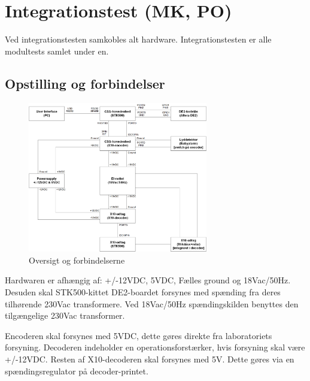 \section{Integrationstest (MK, PO)}
Ved integrationstesten samkobles alt hardware. Integrationstesten er alle modultests samlet under en. 

\subsection{Opstilling og forbindelser}

\begin{figure}[H]
	\centering
	\includegraphics[width=0.7\textwidth]{billeder/IntTest/Integration_oversigt}
	\caption{Oversigt og forbindelserne}
	\label{fig:integration_oversigt}
\end{figure}

Hardwaren er afhængig af: +/-12VDC, 5VDC, Fælles ground og 18Vac/50Hz. Desuden skal STK500-kittet DE2-boardet forsynes med spænding fra deres tilhørende 230Vac transformere. Ved 18Vac/50Hz spændingskilden benyttes den tilgængelige 230Vac transformer. 

Encoderen skal forsynes med 5VDC, dette gøres direkte fra laboratoriets forsyning.
Decoderen indeholder en operationsforstærker, hvis forsyning skal være +/-12VDC. Resten af X10-decoderen skal forsynes med 5V. Dette gøres via en spændingsregulator på decoder-printet.   


